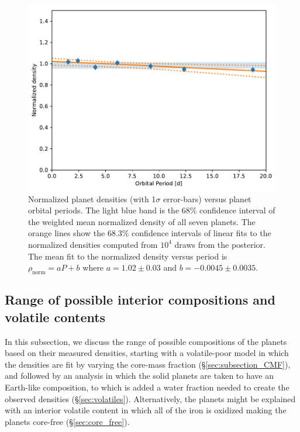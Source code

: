 \documentclass[fleqn,usenatbib]{mnras} %
\begin{document}
\begin{figure}
    \centering
    \includegraphics[width=\hsize]{figures/Norm_dens_vs_period.pdf}
    \caption{Normalized planet densities (with 1$\sigma$ error-bars) versus planet orbital periods. The light blue band is the 68\% confidence interval of the weighted mean normalized density of all seven planets.  The orange lines show the 68.3\% confidence intervals of linear fits to the normalized densities computed from $10^4$
     draws from the posterior.  The mean fit to the normalized density versus period is $\rho_\mathrm{norm}= a P + b$ where $a= 1.02\pm 0.03$ and $b=-0.0045\pm0.0035$.}
    \label{fig:norm_density_vs_period}
\end{figure}


\subsection{Range of possible interior compositions and volatile contents}  \label{sec:interior_compositions}

In this subsection, we discuss the range of possible compositions of the planets based on their measured densities,
starting with a volatile-poor model in which the densities are fit by varying the core-mass fraction (\S \ref{sec:subsection_CMF}),
and followed by an analysis in which the solid planets are taken to have an Earth-like composition, to which is added a water fraction needed to create the observed densities (\S \ref{sec:volatiles}). %
Alternatively, the planets might be explained with an interior volatile content in which all of the iron is oxidized making the planets core-free (\S \ref{sec:core_free}).
\end{document}
